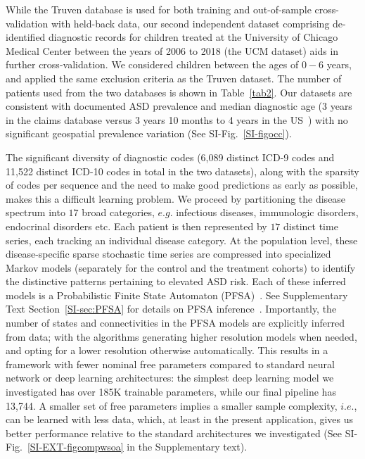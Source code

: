 \documentclass[onecolumn,10pt]{IEEEtran}
\begin{document}
While the Truven database is used for both training and out-of-sample cross-validation with held-back  data, our second independent dataset  comprising de-identified diagnostic records for children treated at the University of Chicago Medical Center between the years of 2006 to 2018 (the UCM dataset) aids in further cross-validation. We considered children between the ages of $0-6$ years, and  applied the same exclusion criteria as the Truven dataset.  The  number of  patients used from the two databases is shown in Table~\ref{tab2}. Our datasets are consistent with documented ASD prevalence and median diagnostic age (3 years in the claims database  versus 3 years 10 months to 4 years  in the US~\cite{pmid29701730}) with no significant geospatial prevalence variation (See SI-Fig.~\ref{SI-figocc}).

The significant diversity of diagnostic codes (6,089 distinct ICD-9 codes and 11,522 distinct ICD-10 codes in total in the two datasets), along with the sparsity of codes per sequence and the need to make good predictions as early as possible,  makes this a difficult learning problem.  We proceed by  partitioning the  disease spectrum into $17 $ broad categories, $e.g.$ infectious diseases, immunologic disorders, endocrinal disorders etc. Each patient is then represented by $17$ distinct time series, each  tracking an individual disease category. At the population level, these disease-specific sparse stochastic time series are  compressed into specialized Markov models (separately for the control and the treatment cohorts) to identify  the distinctive patterns  pertaining to elevated ASD risk. Each of these inferred models is a Probabilistic Finite State Automaton (PFSA)~\cite{CR08}. See Supplementary Text Section~\ref{SI-sec:PFSA} for details on PFSA inference~\cite{CL12g,Chattopadhyay20140826}.  {\HCOL Importantly, the number of states and connectivities in the PFSA models are explicitly inferred from data; with the algorithms generating higher resolution models when needed, and opting for a lower resolution otherwise automatically. This results in a framework with fewer nominal free parameters compared to standard neural network or deep learning architectures: the simplest deep learning model we investigated has over 185K trainable parameters, while our final pipeline has 13,744. A smaller set of free parameters implies a smaller sample complexity, $i.e.$, can be learned with less data, which, at least in the present application, gives us better performance relative to the standard architectures we investigated (See SI-Fig.~\ref{SI-EXT-figcompwsoa} in the Supplementary text).}
\end{document}
